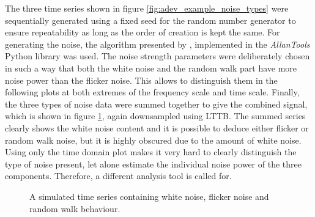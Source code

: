 The three time series shown in figure \ref{fig:adev_example_noise_types} were sequentially generated using a fixed seed for the random number generator to ensure repeatability as long as the order of creation is kept the same. For generating the noise, the algorithm presented by \citeauthor{noise_generation} \cite{noise_generation}, implemented in the \textit{AllanTools} Python library was used. The noise strength parameters were deliberately chosen in such a way that both the white noise and the random walk part have more noise power than the flicker noise. This allows to distinguish them in the following plots at both extremes of the frequency scale and time scale. Finally, the three types of noise data were summed together to give the combined signal, which is shown in figure \ref{fig:adev_example_time}, again downsampled using LTTB. The summed series clearly shows the white noise content and it is possible to deduce either flicker or random walk noise, but it is highly obscured due to the amount of white noise. Using only the time domain plot makes it very hard to clearly distinguish the type of noise present, let alone estimate the individual noise power of the three components. Therefore, a different analysis tool is called for.
\begin{figure}[ht]
    \centering
    \caption{A simulated time series containing white noise, flicker noise and random walk behaviour.}
    \label{fig:adev_example_time}
\end{figure}

